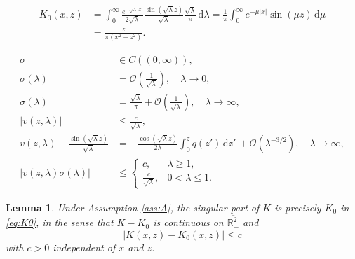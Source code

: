 \documentclass[10pt,a4paper]{amsart}
\newtheorem{lemma}{Lemma}
\newcommand{\R}{\mathbb R}
\newcommand{\dd}{\mathrm d}
\begin{document}
\begin{align}
	K_0(x,z) &= \int_0^\infty \frac{e^{-\sqrt\lambda|x|}}{2\sqrt\lambda}\frac{\sin(\sqrt\lambda z)}{\sqrt\lambda}\frac{\sqrt\lambda}{\pi}\,\dd\lambda = \frac{1}{\pi} \int_0^\infty e^{-\mu|x|}\sin(\mu z)\,\dd \mu \nonumber\\
	&= \frac{z}{\pi(x^2+z^2)}.\label{eq:K0}
\end{align}

	\begin{align}
		\sigma &\in C((0,\infty)),\label{eq:sigma_continuous}\\
		\sigma(\lambda) &= \mathcal O\left(\frac{1}{\sqrt\lambda}\right),\quad \lambda\to 0,\label{eq:sigma_asymptotics_zero}\\
		\sigma(\lambda) &= \frac{\sqrt\lambda}{\pi}+\mathcal O\left(\frac{1}{\sqrt\lambda}\right),\quad \lambda\to\infty,\label{eq:sigma_asymptotics_infinity}\\
		|v(z,\lambda)| &\le \frac{c}{\sqrt\lambda},\label{eq:est_v}\\
		v(z,\lambda)-\frac{\sin(\sqrt\lambda z)}{\sqrt\lambda} &= -\frac{\cos(\sqrt\lambda z)}{2\lambda}\int_0^z q(z')\,\dd z'\, + \mathcal O(\lambda^{-3/2}),\quad \lambda\to\infty,\label{eq:asymp_v-v0}\\
		|v(z,\lambda)\sigma(\lambda)| &\le \begin{cases}c,&\lambda\ge1,\\\frac{c}{\sqrt\lambda},&0<\lambda\le1.\end{cases}\label{eq:est_v*sigma}
	\end{align}

\begin{lemma}\label{lem:K_est}
	Under Assumption \eqref{ass:A}, the singular part of $K$ is precisely $K_0$ in \eqref{eq:K0}, in the sense that $K-K_0$ is continuous on $\overline{\R^2_+}$ and
	\[|K(x,z)-K_0(x,z)| \le c\]
	with $c>0$ independent of $x$ and $z$.
\end{lemma}
\end{document}
